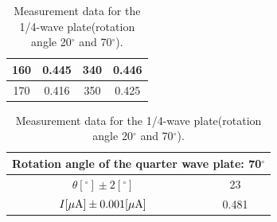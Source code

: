 \documentclass{my_template}
\begin{document}
\begin{table}[!ht]
\begin{tabular}{|c|c||c|c|}
            160&0.445&340&0.446\\\hline
            170&0.416&350&0.425\\\hline
        \end{tabular}
        \begin{tabular}{|c|c|}
            \hline
            \multicolumn{2}{|c|}{Rotation angle of the quarter wave plate: 70$^\circ$}\\\hline
            $\theta[^\circ]\pm 2[^\circ]$&23\\\hline
            $I[\mu \rm A]\pm 0.001[\mu A]$&0.481\\\hline
        \end{tabular}
        \caption{Measurement data for the 1/4-wave plate(rotation angle 20$^\circ$ and 70$^\circ$).}
        \label{tab:20 quarterplate}
    \end{table}
\end{document}
